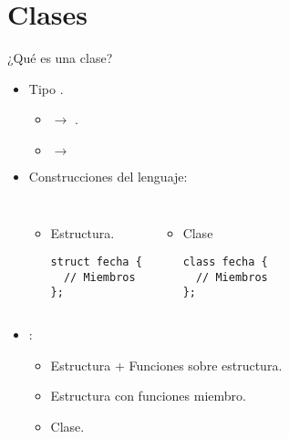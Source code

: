 \section{Clases}

\begin{frame}[t,fragile]{¿Qué es una clase?}
\begin{itemize}
  \item Tipo .
    \begin{itemize}
      \item {} $\rightarrow$ .
      \item {} $\rightarrow$ 
    \end{itemize}

  \item Construcciones del lenguaje:

\begin{columns}[T]

    \begin{itemize}
      \item Estructura.
\begin{lstlisting}
struct fecha {
  // Miembros
};
\end{lstlisting}
    \end{itemize}

    \begin{itemize}
      \item Clase
\begin{lstlisting}
class fecha {
  // Miembros
};
\end{lstlisting}
    \end{itemize}


\end{columns}


  \item {}:
    \begin{itemize}
      \item Estructura + Funciones sobre estructura.
      \item Estructura con funciones miembro.
      \item Clase.    
    \end{itemize}
\end{itemize}
\end{frame}


